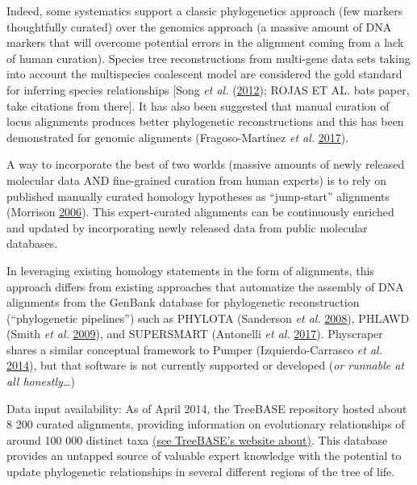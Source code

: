 \documentclass[]{article}
\begin{document}
Indeed, some systematics support a classic phylogenetics approach (few markers thoughtfully curated) over the genomics approach (a massive amount of DNA markers that will overcome potential errors in the alignment coming from a lack of human curation).
Species tree reconstructions from multi-gene data sets taking into account the multispecies coalescent model are considered the gold standard for inferring species relationships {[}Song \emph{et al.} (\protect\hyperlink{ref-song2012resolving}{2012}); ROJAS ET AL. bats paper, take citations from there{]}.
It has also been suggested that manual curation of locus alignments produces better phylogenetic reconstructions and this has been demonstrated for genomic alignments (Fragoso-Martínez \emph{et al.} \protect\hyperlink{ref-fragoso2017pilot}{2017}).

A way to incorporate the best of two worlds (massive amounts of newly released molecular data AND fine-grained curation from human experts) is to rely on published manually curated homology hypotheses as ``jump-start'' alignments (Morrison \protect\hyperlink{ref-morrison2006multiple}{2006}). This expert-curated alignments can be continuously enriched and updated by incorporating newly released data from public molecular databases.

In leveraging existing homology statements in the form of alignments, this approach differs from existing approaches that automatize the assembly of DNA alignments from the GenBank database for phylogenetic reconstruction (``phylogenetic pipelines'') such as PHYLOTA (Sanderson \emph{et al.} \protect\hyperlink{ref-sanderson2008phylota}{2008}), PHLAWD (Smith \emph{et al.} \protect\hyperlink{ref-smith2009mega}{2009}), and SUPERSMART (Antonelli \emph{et al.} \protect\hyperlink{ref-antonelli2017toward}{2017}).
Physcraper shares a similar conceptual framework to Pumper (Izquierdo-Carrasco \emph{et al.} \protect\hyperlink{ref-izquierdo-carrasco_pumper:_2014}{2014}), but that software is not currently supported or developed (\emph{or runnable at all honestly\ldots{}})

Data input availability:
As of April 2014, the TreeBASE repository hosted about 8 200 curated alignments, providing information on evolutionary relationships of around 100 000 distinct taxa \href{https://www.treebase.org/treebase-web/home.html\#:~:text=TreeBASE\%20is\%20produced\%20and\%20governed,mapped\%20to\%20104\%2C593\%20distinct\%20taxa.}{(see TreeBASE's website about)}.
This database provides an untapped source of valuable expert knowledge with the potential to update phylogenetic relationships in several different regions of the tree of life.
\end{document}
